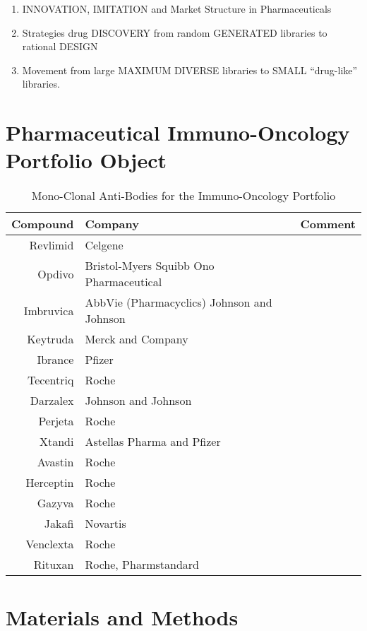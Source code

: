 


\begin{enumerate}
	\item INNOVATION, IMITATION and Market Structure in Pharmaceuticals \cite{key400}
	\item Strategies drug DISCOVERY from random GENERATED libraries to rational DESIGN \cite{key500}
	\item Movement from large MAXIMUM DIVERSE libraries to SMALL “drug-like” libraries. \cite{key500}
\end{enumerate}

\section{Pharmaceutical Immuno-Oncology Portfolio Object}

\begin{table}
	\caption{Mono-Clonal Anti-Bodies for the Immuno-Oncology Portfolio \cite{key8001} }
	\begin{tabular}{r|p{4cm}|l}
		Compound & Company & Comment \\
		\hline
		Revlimid & Celgene & \\
		Opdivo & Bristol-Myers Squibb Ono Pharmaceutical & \\
		Imbruvica & AbbVie (Pharmacyclics) Johnson and Johnson & \\
		Keytruda & Merck and Company & \\
		Ibrance & Pfizer & \\
		Tecentriq & Roche & \\
		Darzalex & Johnson and Johnson & \\
		Perjeta & Roche & \\
		Xtandi & Astellas Pharma and Pfizer & \\
		Avastin & Roche & \\
		Herceptin & Roche & \\
		Gazyva & Roche & \\
		Jakafi & Novartis & \\
		Venclexta & Roche & \\
		Rituxan & Roche, Pharmstandard & \\
		\hline
	\end{tabular}
\end{table}

\section{Materials and Methods}

